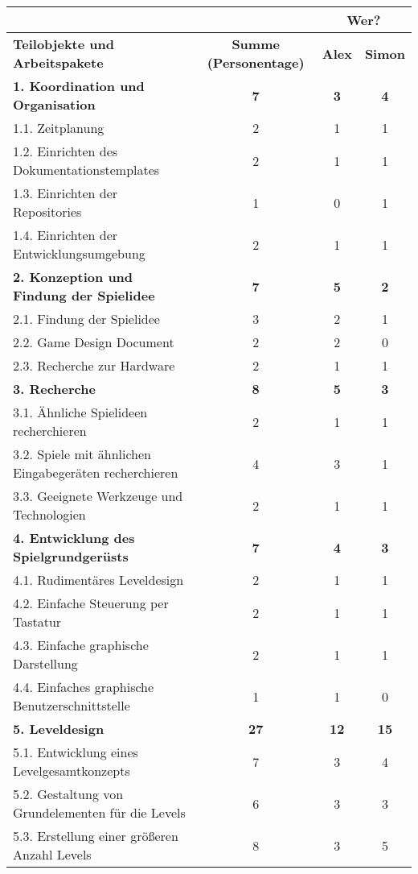 \begingroup
\scriptsize
\begin{tabularx}{\textwidth}{|X|c|c|c|} \hline
 &  & \multicolumn{2}{c|}{\textbf{Wer?}} \\ \hline
\textbf{Teilobjekte und Arbeitspakete} & \textbf{Summe (Personentage)} & \textbf{Alex} & \textbf{Simon} \\ \hline
\textbf{1. Koordination und Organisation} & \textbf{7} & \textbf{3} & \textbf{4} \\ \hline
1.1. Zeitplanung & 2 & 1 & 1 \\ \hline
1.2. Einrichten des Dokumentationstemplates & 2 & 1 & 1 \\ \hline
1.3. Einrichten der Repositories & 1 & 0 & 1 \\ \hline
1.4. Einrichten der Entwicklungsumgebung & 2 & 1 & 1 \\ \hline
\textbf{2. Konzeption und Findung der Spielidee} & \textbf{7} & \textbf{5} & \textbf{2} \\ \hline
2.1. Findung der Spielidee & 3 & 2 & 1 \\ \hline
2.2. Game Design Document & 2 & 2 & 0 \\ \hline
2.3. Recherche zur Hardware & 2 & 1 & 1 \\ \hline
\textbf{3. Recherche} & \textbf{8} & \textbf{5} & \textbf{3} \\ \hline
3.1. Ähnliche Spielideen recherchieren & 2 & 1 & 1 \\ \hline
3.2. Spiele mit ähnlichen Eingabegeräten recherchieren & 4 & 3 & 1 \\ \hline
3.3. Geeignete Werkzeuge und Technologien & 2 & 1 & 1 \\ \hline
\textbf{4. Entwicklung des Spielgrundgerüsts} & \textbf{7} & \textbf{4} & \textbf{3} \\ \hline
4.1. Rudimentäres Leveldesign & 2 & 1 & 1 \\ \hline
4.2. Einfache Steuerung per Tastatur & 2 & 1 & 1 \\ \hline
4.3. Einfache graphische Darstellung & 2 & 1 & 1 \\ \hline
4.4. Einfaches graphische Benutzerschnittstelle & 1 & 1 & 0 \\ \hline
\textbf{5. Leveldesign} & \textbf{27} & \textbf{12} & \textbf{15} \\ \hline
5.1. Entwicklung eines Levelgesamtkonzepts & 7 & 3 & 4 \\ \hline
5.2. Gestaltung von Grundelementen für die Levels & 6 & 3 & 3 \\ \hline
5.3. Erstellung einer größeren Anzahl Levels & 8 & 3 & 5 \\ \hline

\end{tabularx}
